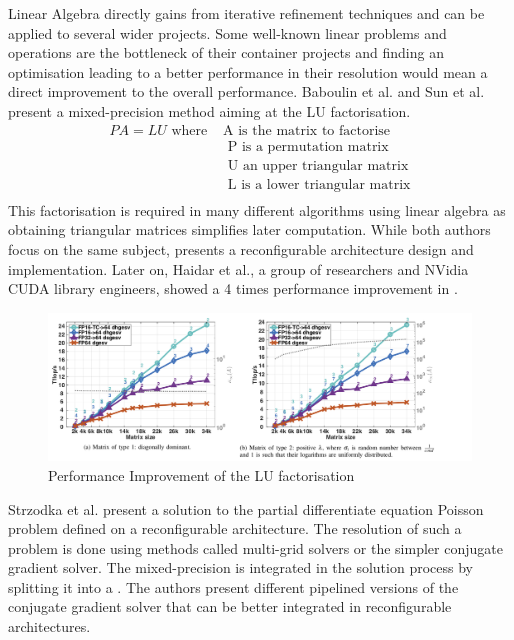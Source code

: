 Linear Algebra directly gains from iterative refinement techniques and can be applied to several wider projects. Some well-known linear problems and operations are the bottleneck of their container projects and finding an optimisation leading to a better performance in their resolution would mean a direct improvement to the overall performance. Baboulin et al. \cite{Baboulin2009} and Sun et al. \cite{Sun2008} present a mixed-precision method aiming at the LU factorisation.
\begin{align}
  PA=LU \textrm{ where } & \textrm{A is the matrix to factorise} \\
        & \textrm{ P is a permutation matrix} \\
        & \textrm{ U an upper triangular matrix} \\
        & \textrm{ L is a lower triangular matrix} \\
\end{align}
This factorisation is required in many different algorithms using linear algebra as obtaining triangular matrices simplifies later computation. While both authors focus on the same subject, \cite{Sun2008} presents a reconfigurable architecture design and implementation. Later on, Haidar et al., a group of researchers and NVidia CUDA library engineers, showed a 4 times performance improvement in \cite{Haidar2018}.

\begin{figure}[htbp]
	\centering
		\includegraphics[width=16cm]{Figures/HaidarPerf.png}
	\caption[Performance Improvement]{Performance Improvement of the LU factorisation \cite{Haidar2018}}
	\label{fig:HaidarPerf}
\end{figure}

Strzodka et al. \cite{Strzodka2006} present a solution to the partial differentiate equation Poisson problem defined on a reconfigurable architecture. The resolution of such a problem is done using methods called multi-grid solvers or the simpler conjugate gradient solver. The mixed-precision is integrated in the solution process by splitting it into a . The authors present different pipelined versions of the conjugate gradient solver that can be better integrated in reconfigurable architectures.

